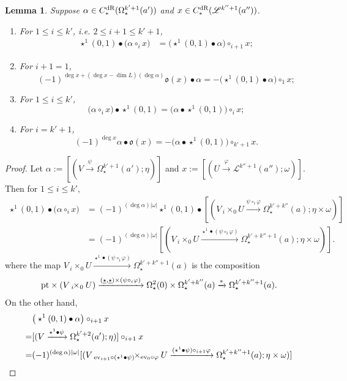 \documentclass[10pt]{amsart}
\numberwithin{equation}{section}
\theoremstyle{plain}
\newtheorem{lemma}[theorem]{Lemma}
\theoremstyle{definition}
\theoremstyle{remark}
\numberwithin{equation}{section}
\newcommand{\ev}{\textup{ev}}
\newcommand{\dR}{\textup{dR}}
\newcommand{\pt}{\textup{pt}}
\newcommand{\fiberprod}[2]{\,_{#1}\!\!\times_{#2} }
\begin{document}
{\begin{lemma}\label{Lm: dRchainStarAnon}
Suppose $\alpha \in C_*^\dR(\Omega_\star^{k'+1}(a'))$ and  $x\in C_*^\dR(\mathscr{L}^{k''+1}(a''))$. 
	\begin{enumerate}
		\item  For $1\leq i \leq k'$, i.e. $2\leq i+1 \leq k'+1$,\begin{align*}
			\star^1(0,1) \bullet\big( \alpha \circ_i x\big) &= \big(\star^1(0,1)\bullet \alpha\big) \circ_{i+1} x;
		\end{align*}
		\item For $i+1=1$, \[ (-1)^{\deg x + ( \deg x - \dim L)(\deg \alpha)} \mathfrak{o}(x) \bullet \alpha =- \big(\star^1(0,1)\bullet \alpha\big) \circ_1 x; \]
		\item For $1\leq i \leq k'$, \[			\big(\alpha \circ_i x\big) \bullet\star^1(0,1) = \big( \alpha \bullet \star^1(0,1)\big) \circ_i x; \]
		\item For $i=k'+1$, \[ (-1)^{\deg x}\alpha \bullet \mathfrak{o}(x) = -\big(\alpha \bullet \star^1(0,1)\big)\circ_{k'+1} x. \]
	\end{enumerate}
\end{lemma}
\begin{proof}
 Let $\alpha:= [(V\xrightarrow{\psi} \Omega_\star^{k'+1}(a');\eta)]$ and $x:= [(U\xrightarrow{\varphi}\mathscr{L}^{k''+1}(a'');\omega)]$.
Then for $1\leq i\leq k'$,
  \begin{align*}
 	\star^1(0,1)\bullet \big(\alpha\circ_i x\big) &= (-1)^{(\deg \alpha )|\omega|} \star^1(0,1) \bullet [( V\fiberprod{i}{0}U\xrightarrow{\psi\circ_i \varphi} \Omega_\star^{k'+k''}(a); \eta\times \omega )]\\
 	&= (-1)^{(\deg\alpha)|\omega|} [( V\fiberprod{i}{0} U \xrightarrow{ \star^1 \bullet(\psi\circ_i\varphi) } \Omega_\star^{k'+k''+1}(a) ; \eta\times \omega)].
 \end{align*}
 where the map $V\fiberprod{i}{0} U \xrightarrow{\star^1 \bullet(\psi\circ_i\varphi)} \Omega_\star^{k'+k''+1}(a)$ is the composition 
 \[
 \pt \times (V\fiberprod{i}{0}U)\xrightarrow{(\underline{\star},\underline{\star})\times (\psi\circ_i\varphi)}\Omega^2_\star(0) \times \Omega^{k'+k''}_\star(a) \xrightarrow{*}\Omega^{k'+k''+1}_\star(a).
 \]
 On the other hand, 
 \begin{align*}
 	&\big(\star^1(0,1)\bullet \alpha\big) \circ_{i+1} x\\ =& [(V \xrightarrow{\star^1\bullet \psi} \Omega^{k'+2}_\star(a'); \eta )] \circ_{i+1} x\\
 	=& (-1)^{(\deg \alpha)|\omega|} [ (V\fiberprod{ \ev_{i+1}\circ(\star^1\bullet \psi)}{\ev_0\circ \varphi}U \xrightarrow{(\star^1\bullet\psi) \circ_{i+1} \varphi} \Omega_\star^{k'+k''+1}(a); \eta\times \omega) ] 

\end{align*}
\end{proof}}
\end{document}
